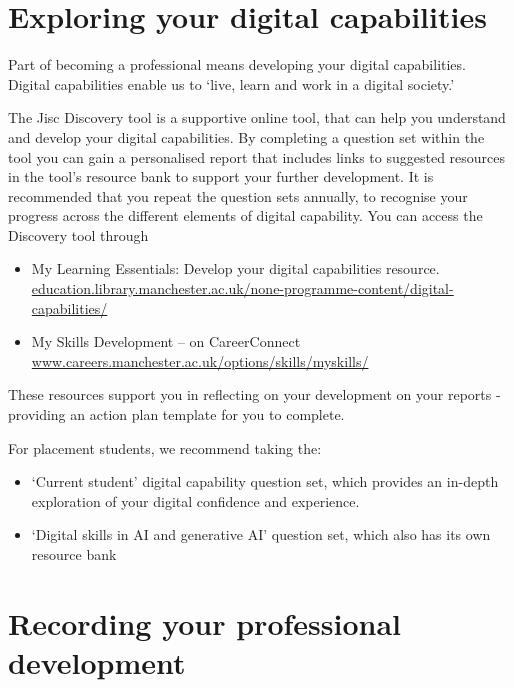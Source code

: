 \documentclass[
]{book}
\providecommand{\tightlist}{%
  \setlength{\itemsep}{0pt}\setlength{\parskip}{0pt}}
\begin{document}
\section{Exploring your digital capabilities}\label{digital}

Part of becoming a professional means developing your digital capabilities. Digital capabilities enable us to `live, learn and work in a digital society.'

The Jisc Discovery tool is a supportive online tool, that can help you understand and develop your digital capabilities. By completing a question set within the tool you can gain a personalised report that includes
links to suggested resources in the tool's resource bank to support your further development. It is recommended that you repeat the question sets annually, to recognise your progress across the different elements of digital capability. You can access the Discovery tool through

\begin{itemize}
\tightlist
\item
  My Learning Essentials: Develop your digital capabilities resource. \href{https://www.education.library.manchester.ac.uk/none-programme-content/digital-capabilities/}{education.library.manchester.ac.uk/none-programme-content/digital-capabilities/}
\item
  My Skills Development -- on CareerConnect \href{https://www.careers.manchester.ac.uk/options/skills/myskills/}{www.careers.manchester.ac.uk/options/skills/myskills/} \citep{audit}
\end{itemize}

These resources support you in reflecting on your development on your reports - providing an action plan template for you to complete.

For placement students, we recommend taking the:

\begin{itemize}
\tightlist
\item
  `Current student' digital capability question set, which provides an in-depth exploration of your digital confidence and experience.
\item
  `Digital skills in AI and generative AI' question set, which also has its own resource bank
\end{itemize}

\section{Recording your professional development}\label{development}
\end{document}
